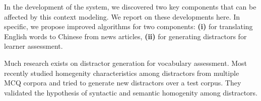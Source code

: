 In the development of the system, we discovered two key components
that can be affected by this context modeling.  We report on these
developments here. In specific, we propose improved algorithms for
two components: \textbf{(i)} for translating English words to Chinese
from news articles, \textbf{(ii)} for generating distractors 
for learner assessment.

Much research exists on distractor generation for vocabulary assessment. 
Most recently \cite{pho2014multiple} studied homegenity characteristics among 
distractors from multiple MCQ corpora and tried to generate new distractors over 
a test corpus. They validated the hypothesis of syntactic and semantic homogenity 
among distractors.



